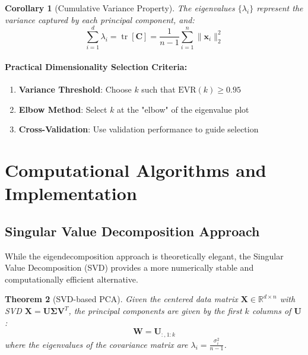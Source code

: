 \documentclass[12pt]{article}
\renewcommand{\vec}[1]{\mathbf{#1}}
\DeclareMathOperator{\tr}{tr}
\newtheorem{theorem}{Theorem}[section]
\newtheorem{corollary}[theorem]{Corollary}
\begin{document}
\begin{corollary}[Cumulative Variance Property]
    The eigenvalues $\{\lambda_i\}$ represent the variance captured by each principal component, and:
    \begin{equation}
        \sum_{i=1}^d \lambda_i = \tr[\vec{C}] = \frac{1}{n-1}\sum_{i=1}^n \|\vec{x}_i\|_2^2
    \end{equation}
\end{corollary}

\paragraph{Practical Dimensionality Selection Criteria:}
\begin{enumerate}[noitemsep]
    \item \textbf{Variance Threshold}: Choose $k$ such that $\text{EVR}(k) \geq 0.95$
    \item \textbf{Elbow Method}: Select $k$ at the "elbow" of the eigenvalue plot
    \item \textbf{Cross-Validation}: Use validation performance to guide selection
\end{enumerate}

\newpage

\section{Computational Algorithms and Implementation}


\subsection{Singular Value Decomposition Approach}

While the eigendecomposition approach is theoretically elegant, the Singular Value Decomposition (SVD) provides a more numerically stable and computationally efficient alternative.

\begin{theorem}[SVD-based PCA] \label{thm:svd_pca}
    Given the centered data matrix $\vec{X} \in \mathbb{R}^{d \times n}$ with SVD $\vec{X} = \vec{U}\vec{\Sigma}\vec{V}^T$, the principal components are given by the first $k$ columns of $\vec{U}$:
    \begin{equation}
        \vec{W} = \vec{U}_{:,1:k}
    \end{equation}
    where the eigenvalues of the covariance matrix are $\lambda_i = \frac{\sigma_i^2}{n-1}$.
\end{theorem}
\end{document}
